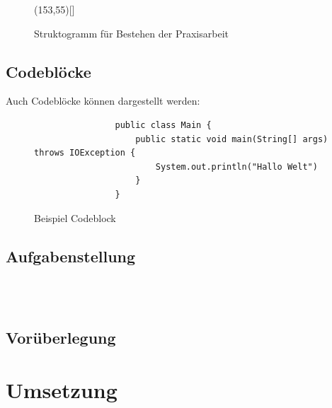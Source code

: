 \documentclass[12pt]{report}
\begin{document}
\begin{figure}[h!]
	\begin{struktogramm}(153,55)[]
		
		\change %
			\forallinend
			\return{\sFalse}
		\ifend
	\end{struktogramm}
	\caption{Struktogramm für Bestehen der Praxisarbeit}
	\label{fig:StruktoBestehen}
\end{figure}

\pagebreak
\section{Codeblöcke}
Auch Codeblöcke können dargestellt werden:

\begin{figure}[h!]
	\centering
			\begin{lstlisting}
				public class Main {
					public static void main(String[] args) throws IOException {
						System.out.println("Hallo Welt")
					}
				}
			\end{lstlisting}
	\caption{Beispiel Codeblock}
	\label{fig:BspCodeblock}
\end{figure}


\pagebreak
\section{Aufgabenstellung}
\blindtext
\\
\\
\blindtext


\pagebreak
\section{Vorüberlegung}
\blindtext


\newpage
\chapter{Umsetzung}
\blindtext
\end{document}
